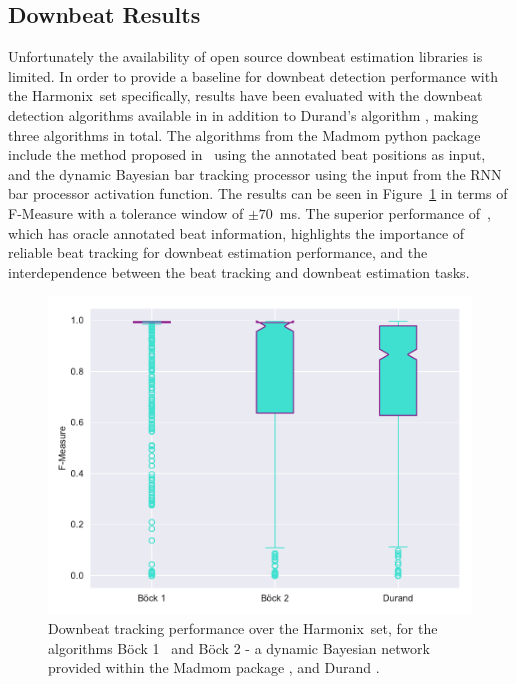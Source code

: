 \documentclass{article}
\newcommand{\setName}{Harmonix}
\begin{document}
\subsection{Downbeat Results}

Unfortunately the availability of open source downbeat estimation libraries is limited. In order to provide a baseline for downbeat detection performance
with the \setName~set specifically, results have been evaluated with the downbeat detection algorithms available in \cite{Bock2016b} in addition to Durand's algorithm \cite{Durand2016}, making three algorithms in total.
The algorithms from the Madmom python package \cite{Bock2016b} include the method proposed in~\cite{Bock2016} using the annotated beat positions as input, and the dynamic Bayesian bar tracking processor using the input from the RNN bar processor activation
function. The results can be seen in Figure~\ref{fig:downbeat_results} in terms of F-Measure with a tolerance window of $\pm 70$~ms. The superior performance of~\cite{Bock2016}, which has oracle annotated beat information, highlights the importance
of reliable beat tracking for downbeat estimation performance, and the interdependence between the beat tracking and downbeat estimation tasks.

\begin{figure}
    \centerline{\includegraphics[width=\columnwidth]{figs/2019_04_09_10_27_35_Downbeat_Re_F-Measure.pdf}}
    \caption{Downbeat tracking performance over the \setName~set, for the algorithms B{\"o}ck 1~\cite{Bock2016} and B{\"o}ck 2 - a dynamic Bayesian network provided within the Madmom package \cite{Bock2016b}, and Durand \cite{Durand2016}.}
    \label{fig:downbeat_results}
\end{figure}
\end{document}
